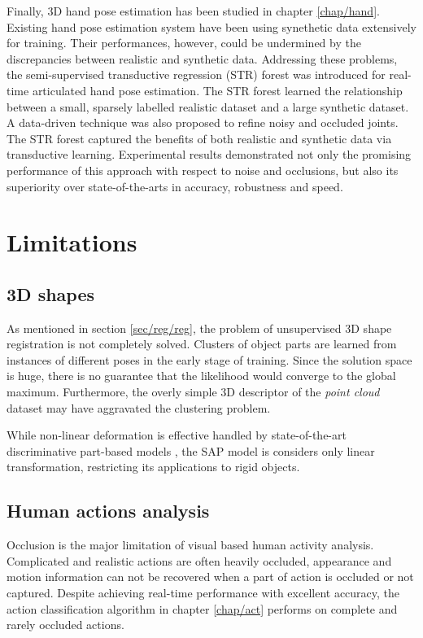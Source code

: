 Finally, 3D hand pose estimation has been studied in chapter \ref{chap/hand}. 
Existing hand pose estimation system have been using synethetic data extensively for training. Their performances, however, could be undermined by the discrepancies between realistic and synthetic data. Addressing these problems, the semi-supervised transductive regression (STR) forest was introduced for real-time articulated hand pose estimation. The STR forest learned the relationship between a small, sparsely labelled realistic dataset and a large synthetic dataset. A data-driven technique was also proposed to refine noisy and occluded joints. The STR forest captured the benefits of both realistic and synthetic data via transductive learning. 
Experimental results demonstrated not only the promising performance of this approach with respect to noise and occlusions, but also its superiority over state-of-the-arts in accuracy, robustness and speed.

\section{Limitations}

\subsection{3D shapes} 

As mentioned in section \ref{sec/reg/reg}, the problem of unsupervised 3D shape registration is not completely solved. Clusters of object parts are learned from instances of different poses in the early stage of training. Since the solution space is huge, there is no guarantee that the likelihood would converge to the global maximum. Furthermore, the overly simple 3D descriptor of the \emph{point cloud} dataset may have aggravated the clustering problem.   

While non-linear deformation is effective handled by state-of-the-art discriminative part-based models \cite{Felzenszwalb2010, Andriluka2009, Pishchulin2012}, the SAP model is considers only linear transformation, restricting its applications to rigid objects. 

\subsection{Human actions analysis} 

Occlusion is the major limitation of visual based human activity analysis. 
Complicated and realistic actions are often heavily occluded, appearance and motion information can not be recovered when a part of action is occluded or not captured. Despite achieving real-time performance with excellent accuracy, the action classification algorithm in chapter \ref{chap/act} performs on complete and rarely occluded actions. 

